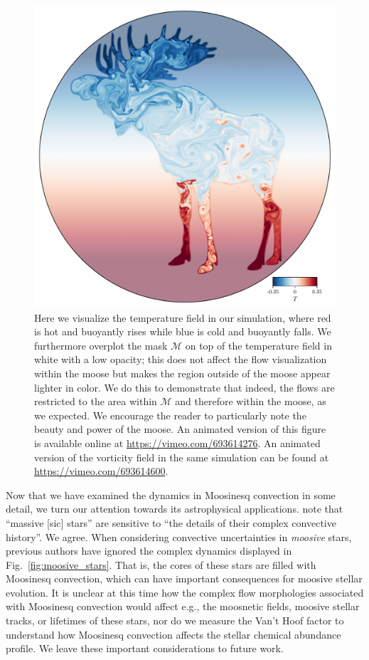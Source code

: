 \begin{figure}[tp!]
\centering
    \includegraphics[width=\textwidth]{paper_figure02.pdf}
\caption{ 
    Here we visualize the temperature field in our simulation, where red is hot and buoyantly rises while blue is cold and buoyantly falls.
    We furthermore overplot the mask $\mathcal{M}$ on top of the temperature field in white with a low opacity; this does not affect the flow visualization within the moose but makes the region outside of the moose appear lighter in color.
    We do this to demonstrate that indeed, the flows are restricted to the area within $\mathcal{M}$ and therefore within the moose, as we expected.
    We encourage the reader to particularly note the beauty and power of the moose.
    An animated version of this figure is available online at \url{https://vimeo.com/693614276}.
    An animated version of the vorticity field in the same simulation can be found at \url{https://vimeo.com/693614600}.
\label{fig:dynamics}
}
\end{figure}

Now that we have examined the dynamics in Moosinesq convection in some detail, we turn our attention towards its astrophysical applications.
\citet{kaiser_etal_2020} note that ``massive [sic] stars'' are sensitive to ``the details of their complex convective history''.
We agree.
When considering convective uncertainties in \emph{moosive} stars, previous authors have ignored the complex dynamics displayed in Fig.~\ref{fig:moosive_stars}.
That is, the cores of these stars are filled with Moosinesq convection, which can have important consequences for moosive stellar evolution.
It is unclear at this time how the complex flow morphologies associated with Moosinesq convection would affect e.g., the moosnetic fields, moosive stellar tracks, or lifetimes of these stars, nor do we measure the Van't Hoof factor \citep{vantHoof} to understand how Moosinesq convection affects the stellar chemical abundance profile.
We leave these important considerations to future work.

